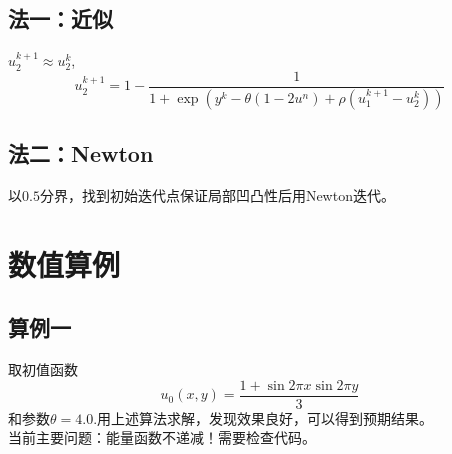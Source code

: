 \documentclass[11pt,a4 paper,one side]{article}
\begin{document}
\subsection{法一：近似}
$u_2^{k+1} \approx u_2^k$,\begin{equation}
    u_2^{k+1} = 1 - \frac{1}{1+\exp{ (y^k-\theta (1-2u^n)+\rho (u_1^{k+1}-u_2^k))}}
\end{equation}
\subsection{法二：Newton}
以$0.5$分界，找到初始迭代点保证局部凹凸性后用Newton迭代。
\section{数值算例}
\subsection{算例一}取初值函数\begin{equation}
u_0(x,y)=\frac{1+\sin{2\pi x}\sin {2\pi y}}{3}
\end{equation}
和参数$\theta = 4.0$.用上述算法求解，发现效果良好，可以得到预期结果。
\\当前主要问题：能量函数不递减！需要检查代码。
\end{document}
